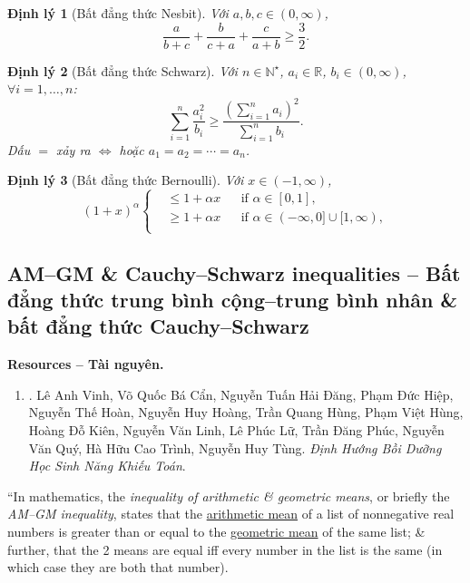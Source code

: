 \documentclass{article}
\newtheorem{dinhly}{Định lý}
\begin{document}
\begin{dinhly}[Bất đẳng thức Nesbit]
	Với $a,b,c\in(0,\infty)$,
	\begin{equation}
		\label{Nesbit inequality}
		\tag{Nesbit}
		\frac{a}{b + c} + \frac{b}{c + a} + \frac{c}{a + b}\ge\frac{3}{2}.
	\end{equation}
\end{dinhly}

\begin{dinhly}[Bất đẳng thức Schwarz]
	Với $n\in\mathbb{N}^\star$, $a_i\in\mathbb{R}$, $b_i\in(0,\infty)$, $\forall i = 1,\ldots,n$:
	\begin{equation}
		\label{Schwarz inequality}
		\tag{Schwarz}
		\sum_{i=1}^n \frac{a_i^2}{b_i}\ge\frac{\left(\sum_{i=1}^n a_i\right)^2}{\sum_{i=1}^n b_i}.
	\end{equation}
	Dấu $=$ xảy ra $\Leftrightarrow$ hoặc $a_1 = a_2 = \cdots = a_n$.
\end{dinhly}

\begin{dinhly}[Bất đẳng thức Bernoulli]
	Với $x\in(-1,\infty)$,
	\begin{equation}
		\label{Bernoulli inequality}
		\tag{Bernoulli}
		(1 + x)^\alpha\left\{\begin{split}
			&\le1 + \alpha x&&\mbox{if }\alpha\in[0,1],\\
			&\ge1 + \alpha x&&\mbox{if }\alpha\in(-\infty,0]\cup[1,\infty),\\
		\end{split}\right.
	\end{equation}
\end{dinhly}

\subsection{AM--GM \& Cauchy--Schwarz inequalities -- Bất đẳng thức trung bình cộng--trung bình nhân \& bất đẳng thức Cauchy--Schwarz}
\textbf{\textsf{Resources -- Tài nguyên.}}
\begin{enumerate}
	\item \cite[Chap. 3: AM--GM \& Cauchy--Schwarz, pp. 55--80]{Vinh_dinh_huong_Olympic_Toan}. {\sc Lê Anh Vinh, Võ Quốc Bá Cẩn, Nguyễn Tuấn Hải Đăng, Phạm Đức Hiệp, Nguyễn Thế Hoàn, Nguyễn Huy Hoàng, Trần Quang Hùng, Phạm Việt Hùng, Hoàng Đỗ Kiên, Nguyễn Văn Linh, Lê Phúc Lữ, Trần Đăng Phúc, Nguyễn Văn Quý, Hà Hữu Cao Trình, Nguyễn Huy Tùng}. {\it Định Hướng Bồi Dưỡng Học Sinh Năng Khiếu Toán}.
\end{enumerate}
``In mathematics, the {\it inequality of arithmetic \& geometric means}, or briefly the {\it AM--GM inequality}, states that the \href{https://en.wikipedia.org/wiki/Arithmetic_mean}{arithmetic mean} of a list of nonnegative real numbers is greater than or equal to the \href{https://en.wikipedia.org/wiki/Geometric_mean}{geometric mean} of the same list; \& further, that the 2 means are equal iff every number in the list is the same (in which case they are both that number).
\end{document}
